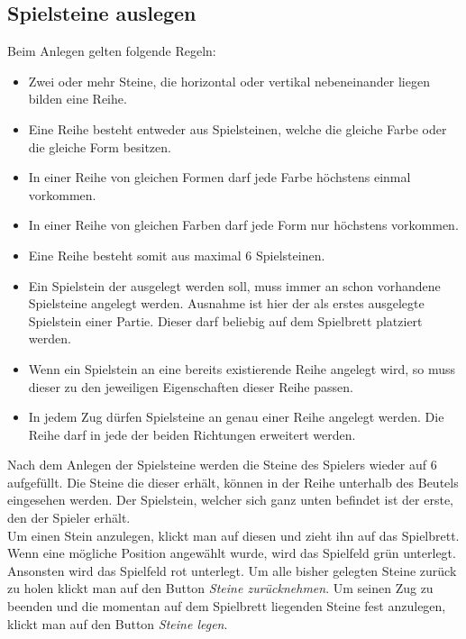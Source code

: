 \documentclass[a4paper, ngerman]{scrartcl}
\begin{document}
\subsection{Spielsteine auslegen}
Beim Anlegen gelten folgende Regeln:
\begin{itemize}
\item Zwei oder mehr Steine, die horizontal oder vertikal nebeneinander liegen bilden eine Reihe.
\item Eine Reihe besteht entweder aus Spielsteinen, welche die gleiche Farbe oder die gleiche Form besitzen.
\item In einer Reihe von gleichen Formen darf jede Farbe höchstens einmal vorkommen.
\item In einer Reihe von gleichen Farben darf jede Form nur höchstens vorkommen.
\item Eine Reihe besteht somit aus maximal 6 Spielsteinen.
\item Ein Spielstein der ausgelegt werden soll, muss immer an schon vorhandene Spielsteine angelegt werden. Ausnahme ist hier der als erstes ausgelegte Spielstein einer Partie. Dieser darf beliebig auf dem Spielbrett platziert werden.
\item Wenn ein Spielstein an eine bereits existierende Reihe angelegt wird, so muss dieser zu den jeweiligen Eigenschaften dieser Reihe passen.
\item In jedem Zug dürfen Spielsteine an genau einer Reihe angelegt werden. Die Reihe darf in jede der beiden Richtungen erweitert werden.
\end{itemize}

Nach dem Anlegen der Spielsteine werden die Steine des Spielers wieder auf 6 aufgefüllt. Die Steine die dieser erhält, können in der Reihe unterhalb des Beutels eingesehen werden. Der Spielstein, welcher sich ganz unten befindet ist der erste, den der Spieler erhält.\\
Um einen Stein anzulegen, klickt man auf diesen und zieht ihn auf das Spielbrett. Wenn eine mögliche Position angewählt wurde, wird das Spielfeld grün unterlegt. Ansonsten wird das Spielfeld rot unterlegt. Um alle bisher gelegten Steine zurück zu holen klickt man auf den Button \emph{Steine zurücknehmen}. Um seinen Zug zu beenden und die momentan auf dem Spielbrett liegenden Steine fest anzulegen, klickt man auf den Button \emph{Steine legen}.
	 
\end{document}
